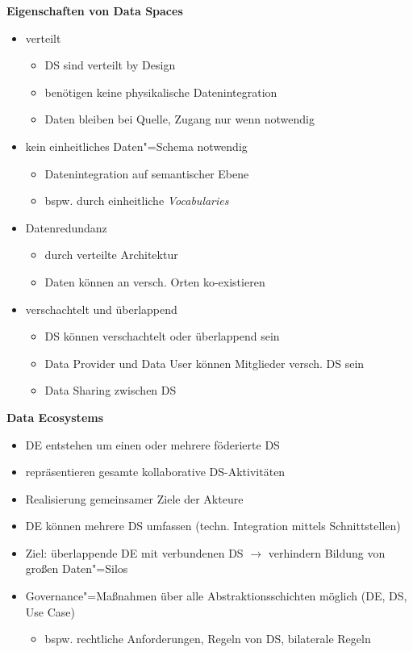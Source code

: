 \textbf{Eigenschaften von Data Spaces}
\begin{itemize}
    \item verteilt
    \begin{itemize}
        \item DS sind verteilt by Design
        \item benötigen keine physikalische Datenintegration
        \item Daten bleiben bei Quelle, Zugang nur wenn notwendig
    \end{itemize}

    \item kein einheitliches Daten"=Schema notwendig
    \begin{itemize}
        \item Datenintegration auf semantischer Ebene
        \item bspw. durch einheitliche \emph{Vocabularies}
    \end{itemize}
    
    \item Datenredundanz
    \begin{itemize}
        \item durch verteilte Architektur
        \item Daten können an versch. Orten ko-existieren
    \end{itemize}
    
    \item verschachtelt und überlappend
    \begin{itemize}
        \item DS können verschachtelt oder überlappend sein
        \item Data Provider und Data User können Mitglieder versch. DS sein
        \item Data Sharing zwischen DS~\cite{mollerIndustrialDataEcosystems2024}
    \end{itemize}
\end{itemize}

\vspace{1em}

\textbf{Data Ecosystems}
\begin{itemize}
    \item DE entstehen um einen oder mehrere föderierte DS
    \item repräsentieren gesamte kollaborative DS-Aktivitäten
    \item Realisierung gemeinsamer Ziele der Akteure
    \item DE können mehrere DS umfassen (techn. Integration mittels Schnittstellen)
    \item Ziel: überlappende DE mit verbundenen DS $\to$ verhindern Bildung von großen Daten"=Silos
    \item Governance"=Maßnahmen über alle Abstraktionsschichten möglich (DE, DS, Use Case)
    \begin{itemize}
        \item bspw. rechtliche Anforderungen, Regeln von DS, bilaterale Regeln
    \end{itemize}
\end{itemize}

